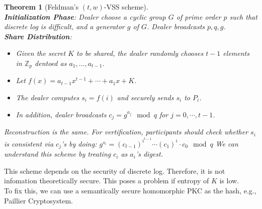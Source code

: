 \documentclass[12pt]{article}
\newtheorem{theorem}{Theorem}[section]
\theoremstyle{definition}
\begin{document}
\begin{theorem}[Feldman's {$(t,w)$}-VSS scheme]
\hfill\\\normalfont \textbf{Initialization Phase}: Dealer choose a cyclic group $G$ of prime order $p$ such that discrete log is difficult, and a generator $g$ of $G$. Dealer broadcasts $p,q,g$.\\
\textbf{Share Distribution}:
\begin{itemize}
  \item Given the secret $K$ to be shared, the dealer randomly chooses $t-1$ elements in $\mathbb{Z}_p$ dentoed as $a_1,\ldots, a_{t-1}$.
  \item Let $f(x)=a_{t-1}x^{t-1}+\cdots+a_1x+K$.
  \item The dealer computes $s_i=f(i)$ and securely sends $s_i$ to $P_i$.
  \item In addition, dealer broadcasts $c_j = g^{a_j}\mod q$ for $j=0,\cdots, t-1$.
\end{itemize}
Reconstruction is the same. For vertification, participants should check whether $s_i$ is consistent via $c_j$'s by doing:
$
g^{s_i}=(c_{t-1})^{i^{t-1}}\cdots(c_1)^i\cdot c_0\mod q
$
We can understand this scheme by treating $c_i$ as $a_i$'s digest.
\end{theorem}
This scheme depends on the security of discrete log. Therefore, it is not infomation theoretically secure. This poses a problem if entropy of $K$ is low.\\
To fix this, we can use a semantically secure homomorphic PKC as the hash, e.g., Paillier Cryptosystem.
\end{document}
